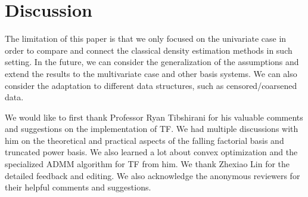 \documentclass[aos]{imsart}
\numberwithin{equation}{section}
\theoremstyle{plain}
\theoremstyle{definition}
\theoremstyle{definition}
\begin{document}









\section{Discussion} \label{sec:discussion}
The limitation of this paper is that we only focused on the univariate case in order to compare and connect the classical density estimation methods in such setting. In the future, we can consider the generalization of the assumptions and extend the results to the multivariate case and other basis systems. We can also consider the adaptation to different data structures, such as censored/coarsened data.


\begin{acks}[Acknowledgments]
We would like to first thank Professor Ryan Tibshirani for his valuable comments and suggestions on the implementation of TF. We had multiple discussions with him on the theoretical and practical aspects of the falling factorial basis and truncated power basis. We also learned a lot about convex optimization and the specialized ADMM algorithm for TF from him. We thank Zhexiao Lin for the detailed feedback and editing. We also acknowledge the anonymous reviewers for their helpful comments and suggestions.
\end{acks}


\begin{supplement}
\end{supplement}




\end{document}
